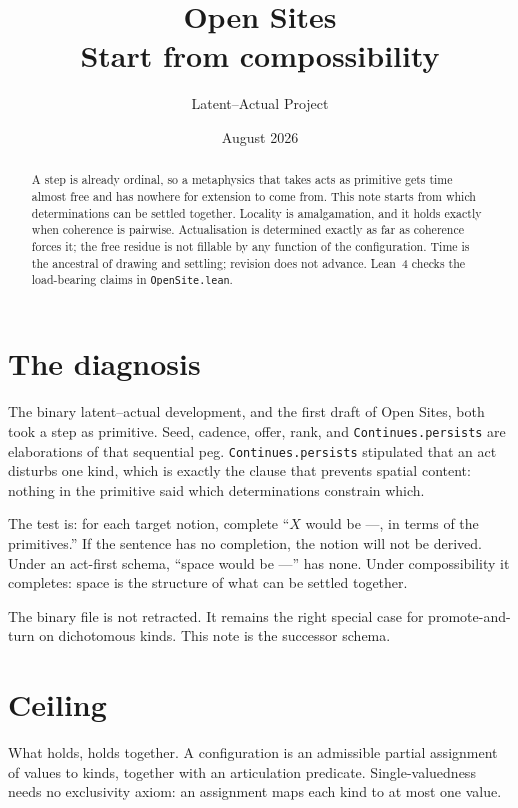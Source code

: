 \documentclass[11pt]{article}
\title{\textbf{Open Sites}\\[0.45em]
  \large Start from compossibility}
\author{Latent--Actual Project}
\date{August 2026}
\theoremstyle{definition}
\newcommand{\lean}[1]{\nolinkurl{#1}}
\begin{document}
\maketitle

\begin{abstract}
A step is already ordinal, so a metaphysics that takes acts as primitive
gets time almost free and has nowhere for extension to come from. This
note starts from which determinations can be settled together. Locality
is amalgamation, and it holds exactly when coherence is pairwise.
Actualisation is determined exactly as far as coherence forces it; the
free residue is not fillable by any function of the configuration.
Time is the ancestral of drawing and settling; revision does not
advance. Lean~4 checks the load-bearing claims in
\texttt{OpenSite.lean}.
\end{abstract}

\section{The diagnosis}

The binary latent--actual development, and the first draft of Open Sites,
both took a step as primitive. Seed, cadence, offer, rank, and
\lean{Continues.persists} are elaborations of that sequential peg.
\lean{Continues.persists} stipulated that an act disturbs one kind, which
is exactly the clause that prevents spatial content: nothing in the
primitive said which determinations constrain which.

The test is: for each target notion, complete ``$X$ would be ---, in
terms of the primitives.'' If the sentence has no completion, the notion
will not be derived. Under an act-first schema, ``space would be ---''
has none. Under compossibility it completes: space is the structure of
what can be settled together.

The binary file is not retracted. It remains the right special case for
promote-and-turn on dichotomous kinds. This note is the successor schema.

\section{Ceiling}

What holds, holds together. A configuration is an admissible partial
assignment of values to kinds, together with an articulation predicate.
Single-valuedness needs no exclusivity axiom: an assignment maps each
kind to at most one value.
\end{document}
